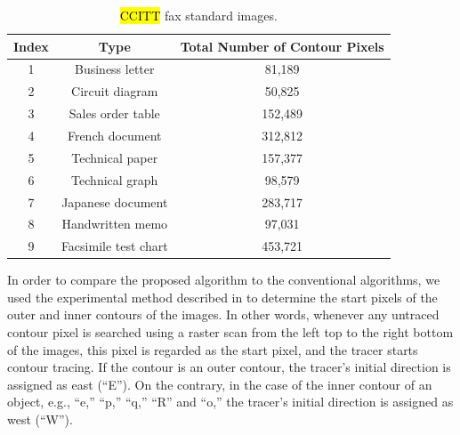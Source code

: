\documentclass[sensors,article,accept,moreauthors,pdftex,10pt,a4paper]{mdpi}
\begin{document}
\begin{table}[H]
	\centering
	\begin{tabular}{ccc}
		\toprule
		\textbf{Index} & \textbf{Type} & \textbf{Total Number of Contour Pixels} \\
		\midrule
		1 & Business letter & 81,189 \\
		2 & Circuit diagram & 50,825 \\
		3 & Sales order table & 152,489 \\
		4 & French document & 312,812 \\
		5 & Technical paper & 157,377 \\
		6 & Technical graph & 98,579 \\
		7 & Japanese document & 283,717 \\
		8 & Handwritten memo & 97,031 \\
		9 & Facsimile test chart & 453,721 \\
		\bottomrule
	\end{tabular}
	\caption{\protect \hl{CCITT} fax standard images.}
	\label{table:ccitt}
\end{table}	


In order to compare the proposed algorithm to the conventional algorithms, we used the experimental method described in \cite{Danielsson1981Improvement} to determine the start pixels of the outer and inner contours of the images. In other words, whenever any untraced contour pixel is searched using a raster scan from the left top to the right bottom of the images, this pixel is regarded as the start pixel, and the tracer starts contour tracing. If the contour is an outer contour, the tracer's initial direction is assigned as east (``E''). On the contrary, in the case of the inner contour of an object, e.g., ``e,'' ``p,'' ``q,'' ``R'' and ``o,'' the tracer's initial direction is assigned as west (``W''). 
\end{document}

